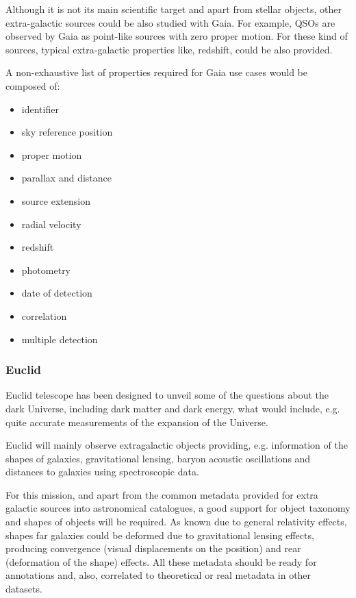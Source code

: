 \documentclass[11pt,a4paper]{ivoa}
\begin{document}
Although it is not its main scientific target and apart from stellar objects,
other extra-galactic sources could be also studied with Gaia. For example, QSOs
are observed by Gaia as point-like sources with zero proper motion. For these
kind of sources, typical extra-galactic properties like, redshift, could be also
provided.

A non-exhaustive list of properties required for Gaia use cases would be composed
of:

\begin{itemize}
    \item identifier
    \item sky reference position
    \item proper motion
    \item parallax and distance

    \item source extension
    \item radial velocity
    \item redshift
    \item photometry
    \item date of detection
    \item correlation
    \item multiple detection
\end{itemize}


\subsubsection{Euclid}
Euclid telescope has been designed to unveil some of the questions about the
dark Universe, including dark matter and dark energy, what would include, e.g.
quite accurate measurements of the expansion of the Universe.

Euclid will mainly observe extragalactic objects providing, e.g. information
of the shapes of galaxies, gravitational lensing,  baryon acoustic oscillations
and distances to galaxies using spectroscopic data.

For this mission, and apart from the common metadata provided for extra galactic
sources into astronomical catalogues, a good support for object taxonomy and
shapes of objects will be required. As known due to general relativity effects,
shapes far galaxies could be deformed due to gravitational lensing effects,
producing convergence (visual displacements on the position) and rear (deformation
of the shape) effects. All these metadata should be ready for annotations and,
also, correlated to theoretical or real metadata in other datasets.
\end{document}
